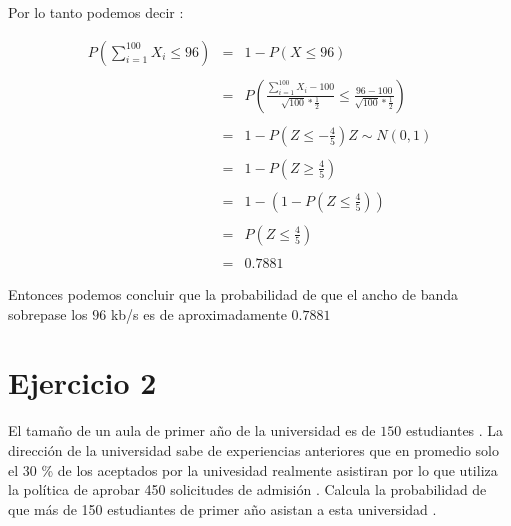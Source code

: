 \documentclass[10pt]{article}
\begin{document}
    \begin{flushleft}
   	    Por lo tanto podemos decir :
    \end{flushleft}
   	\begin{equation*}
		\begin{array}{rcl}
	   	    \displaystyle P\left(\sum_{i=1}^{100}X_{i} \leq 96\right) & = & 1 -  P\left(X \leq  96\right) 
	   	    \\
	   	    \\
	   	    & = &  \displaystyle P\left(\frac{\sum_{i=1}^{100}X_{i} - 100}{\sqrt{100}* \frac{1}{2}} \leq \frac{96 - 100}{\sqrt{100}* \frac{1}{2}}\right) 
	   	    \\
	   	    \\
	   	    & = &  \displaystyle 1 - P\left(Z \leq -\frac{4}{5}\right)Z \sim N(0,1)
	   	    \\
	   	    \\
	   	    & = &  \displaystyle 1 - P\left(Z \geq \frac{4}{5}\right)
	   	    \\
	   	    \\
	   	    & = &  \displaystyle 1 -\left( 1 - P\left(Z \leq \frac{4}{5}\right)\right)
	   	    \\
	   	    \\
	   	    & = &  \displaystyle P\left(Z \leq \frac{4}{5}\right)
	   	    \\
	   	    \\
	        & = & 0.7881
	    \end{array}
	\end{equation*}
	   
	\begin{flushleft}
		Entonces podemos concluir que la probabilidad de que el ancho de banda sobrepase los $96$  kb/s es de aproximadamente  $0.7881$
	\end{flushleft}

  	\section*{Ejercicio 2} 
   	\begin{flushleft}
   		El tama\~no de un aula de primer a\~no de la universidad es de $150$ estudiantes . La direcci\'on de la universidad sabe de experiencias anteriores que en promedio solo el 30 \% de los aceptados por la univesidad realmente asistiran por lo que utiliza la pol\'itica de aprobar 450 solicitudes de admisi\'on . Calcula  la probabilidad de que m\'as de 150 estudiantes de primer a\~no asistan a esta universidad .
   	\end{flushleft}
   
\end{document}
